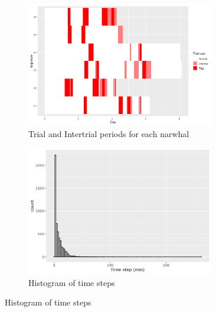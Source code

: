 \documentclass[11pt]{article}
\newcommand {\1}{\mathbb{1}}
\begin{document}
\begin{figure}[H]
    \centering
    \begin{subfigure}{0.49\textwidth}
    	\centering
    \includegraphics[width=0.9\textwidth]{images/data_exploration/trials.png}
    \caption{Trial and Intertrial periods for each narwhal}
    \label{fig: trials and intertrials distributions}
    \end{subfigure}
	\begin{subfigure}{0.49\textwidth}
	\centering
	\includegraphics[width=0.9\textwidth]{images/data_exploration/all_time_steps_histo}
	\caption{Histogram of time steps}
	\label{fig:alltimestepshisto}
	\end{subfigure}
\end{figure}
\end{document}
